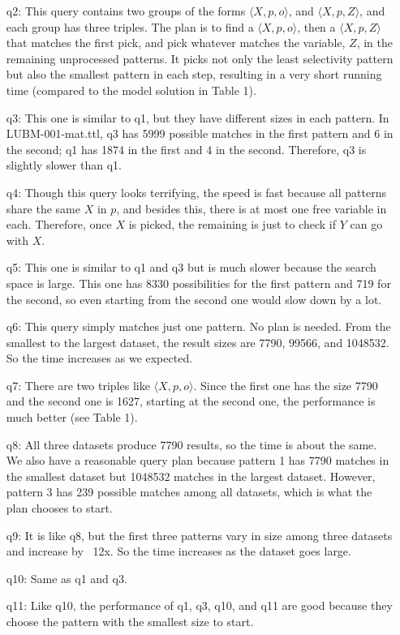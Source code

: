 \documentclass{article}
\begin{document}
\begin{enumerate}
\begin{enumerate}
\item[q2:] This query contains two groups of the forms $\langle X, p, o\rangle$, and $\langle X, p, Z\rangle$, and each group has three triples. The plan is to find a $\langle X, p, o\rangle$, then a $\langle X, p, Z\rangle$ that matches the first pick, and pick whatever matches the variable, $Z$, in the remaining unprocessed patterns. It picks not only the least selectivity pattern but also the smallest pattern in each step, resulting in a very short running time (compared to the model solution in Table 1). 
\item[q3:] This one is similar to q1, but they have different sizes in each pattern. In LUBM-001-mat.ttl, q3 has 5999 possible matches in the first pattern and 6 in the second; q1 has 1874 in the first and 4 in the second. Therefore, q3 is slightly slower than q1. 
\item[q4:] Though this query looks terrifying, the speed is fast because all patterns share the same $X$ in $p$, and besides this, there is at most one free variable in each. Therefore, once $X$ is picked, the remaining is just to check if $Y$ can go with $X$. 
\item[q5:] This one is similar to q1 and q3 but is much slower because the search space is large. This one has 8330 possibilities for the first pattern and  719 for the second, so even starting from the second one would slow down by a lot. 
\item[q6:] This query simply matches just one pattern. No plan is needed. From the smallest to the largest dataset, the result sizes are 7790, 99566, and 1048532. So the time increases as we expected.
\item[q7:] There are two triples like $\langle X, p, o\rangle$. Since the first one has the size 7790 and the second one is 1627, starting at the second one, the performance is much better (see Table 1). 
\item[q8:] All three datasets produce 7790 results, so the time is about the same. We also have a reasonable query plan because pattern 1 has 7790 matches in the smallest dataset but 1048532 matches in the largest dataset. However, pattern 3 has 239 possible matches among all datasets, which is what the plan chooses to start. 
\item[q9:] It is like q8, but the first three patterns vary in size among three datasets and increase by ~12x. So the time increases as the dataset goes large. 
\item[q10:] Same as q1 and q3. 
\item[q11:] Like q10, the performance of q1, q3, q10, and q11 are good because they choose the pattern with the smallest size to start.

\end{enumerate}
\end{enumerate}
\end{document}
